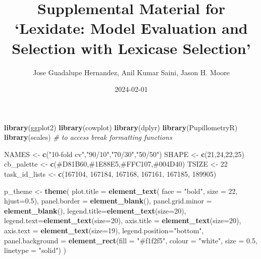 \documentclass[
]{book}
\title{Supplemental Material for `Lexidate: Model Evaluation and Selection with Lexicase Selection'}
\author{Jose Guadalupe Hernandez, Anil Kumar Saini, Jason H. Moore}
\date{2024-02-01}
\newenvironment{Shaded}{\begin{snugshade}}{\end{snugshade}}
\newcommand{\AttributeTok}[1]{\textcolor[rgb]{0.13,0.29,0.53}{#1}}
\newcommand{\CommentTok}[1]{\textcolor[rgb]{0.56,0.35,0.01}{\textit{#1}}}
\newcommand{\DecValTok}[1]{\textcolor[rgb]{0.00,0.00,0.81}{#1}}
\newcommand{\FloatTok}[1]{\textcolor[rgb]{0.00,0.00,0.81}{#1}}
\newcommand{\FunctionTok}[1]{\textcolor[rgb]{0.13,0.29,0.53}{\textbf{#1}}}
\newcommand{\NormalTok}[1]{#1}
\newcommand{\OtherTok}[1]{\textcolor[rgb]{0.56,0.35,0.01}{#1}}
\newcommand{\StringTok}[1]{\textcolor[rgb]{0.31,0.60,0.02}{#1}}
\begin{document}
\maketitle

{
\setcounter{tocdepth}{1}
\tableofcontents
}
\begin{Shaded}
\begin{Highlighting}[]
\FunctionTok{library}\NormalTok{(ggplot2)}
\FunctionTok{library}\NormalTok{(cowplot)}
\FunctionTok{library}\NormalTok{(dplyr)}
\FunctionTok{library}\NormalTok{(PupillometryR)}
\FunctionTok{library}\NormalTok{(scales) }\CommentTok{\# to access break formatting functions}


\NormalTok{NAMES }\OtherTok{\textless{}{-}} \FunctionTok{c}\NormalTok{(}\StringTok{"10{-}fold cv"}\NormalTok{,}\StringTok{"90/10"}\NormalTok{,}\StringTok{"70/30"}\NormalTok{,}\StringTok{"50/50"}\NormalTok{)}
\NormalTok{SHAPE }\OtherTok{\textless{}{-}} \FunctionTok{c}\NormalTok{(}\DecValTok{21}\NormalTok{,}\DecValTok{24}\NormalTok{,}\DecValTok{22}\NormalTok{,}\DecValTok{25}\NormalTok{)}
\NormalTok{cb\_palette }\OtherTok{\textless{}{-}} \FunctionTok{c}\NormalTok{(}\StringTok{\textquotesingle{}\#D81B60\textquotesingle{}}\NormalTok{,}\StringTok{\textquotesingle{}\#1E88E5\textquotesingle{}}\NormalTok{,}\StringTok{\textquotesingle{}\#FFC107\textquotesingle{}}\NormalTok{,}\StringTok{\textquotesingle{}\#004D40\textquotesingle{}}\NormalTok{)}
\NormalTok{TSIZE }\OtherTok{\textless{}{-}} \DecValTok{22}
\NormalTok{task\_id\_lists }\OtherTok{\textless{}{-}} \FunctionTok{c}\NormalTok{(}\DecValTok{167104}\NormalTok{, }\DecValTok{167184}\NormalTok{, }\DecValTok{167168}\NormalTok{, }\DecValTok{167161}\NormalTok{, }\DecValTok{167185}\NormalTok{, }\DecValTok{189905}\NormalTok{)}

\NormalTok{p\_theme }\OtherTok{\textless{}{-}} \FunctionTok{theme}\NormalTok{(}
  \AttributeTok{plot.title =} \FunctionTok{element\_text}\NormalTok{( }\AttributeTok{face =} \StringTok{"bold"}\NormalTok{, }\AttributeTok{size =} \DecValTok{22}\NormalTok{, }\AttributeTok{hjust=}\FloatTok{0.5}\NormalTok{),}
  \AttributeTok{panel.border =} \FunctionTok{element\_blank}\NormalTok{(),}
  \AttributeTok{panel.grid.minor =} \FunctionTok{element\_blank}\NormalTok{(),}
  \AttributeTok{legend.title=}\FunctionTok{element\_text}\NormalTok{(}\AttributeTok{size=}\DecValTok{20}\NormalTok{),}
  \AttributeTok{legend.text=}\FunctionTok{element\_text}\NormalTok{(}\AttributeTok{size=}\DecValTok{20}\NormalTok{),}
  \AttributeTok{axis.title =} \FunctionTok{element\_text}\NormalTok{(}\AttributeTok{size=}\DecValTok{20}\NormalTok{),}
  \AttributeTok{axis.text =} \FunctionTok{element\_text}\NormalTok{(}\AttributeTok{size=}\DecValTok{19}\NormalTok{),}
  \AttributeTok{legend.position=}\StringTok{"bottom"}\NormalTok{,}
  \AttributeTok{panel.background =} \FunctionTok{element\_rect}\NormalTok{(}\AttributeTok{fill =} \StringTok{"\#f1f2f5"}\NormalTok{,}
                                  \AttributeTok{colour =} \StringTok{"white"}\NormalTok{,}
                                  \AttributeTok{size =} \FloatTok{0.5}\NormalTok{, }\AttributeTok{linetype =} \StringTok{"solid"}\NormalTok{)}
\NormalTok{)}
\end{Highlighting}
\end{Shaded}
\end{document}
